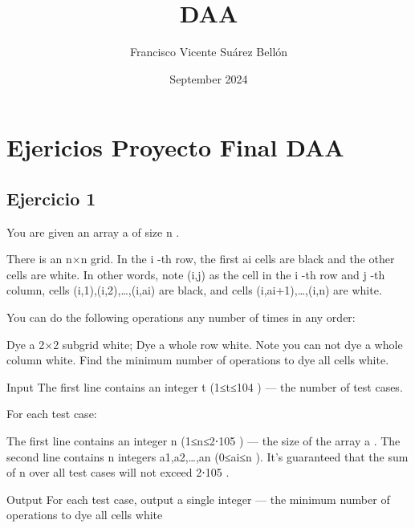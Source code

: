 \documentclass{article}
\title{DAA}
\author{Francisco Vicente Suárez Bellón}
\date{September 2024}
\begin{document}
\maketitle

\section{Ejericios Proyecto Final DAA}

\subsection{Ejercicio 1}

You are given an array a
 of size n
.

There is an n×n
 grid. In the i
-th row, the first ai
 cells are black and the other cells are white. In other words, note (i,j)
 as the cell in the i
-th row and j
-th column, cells (i,1),(i,2),…,(i,ai)
 are black, and cells (i,ai+1),…,(i,n)
 are white.

You can do the following operations any number of times in any order:

Dye a 2×2
 subgrid white;
Dye a whole row white. Note you can not dye a whole column white.
Find the minimum number of operations to dye all cells white.

Input
The first line contains an integer t
 (1≤t≤104
) — the number of test cases.

For each test case:

The first line contains an integer n
 (1≤n≤2⋅105
) — the size of the array a
.
The second line contains n
 integers a1,a2,…,an
 (0≤ai≤n
).
It's guaranteed that the sum of n
 over all test cases will not exceed 2⋅105
.

Output
For each test case, output a single integer — the minimum number of operations to dye all cells white
\end{document}
